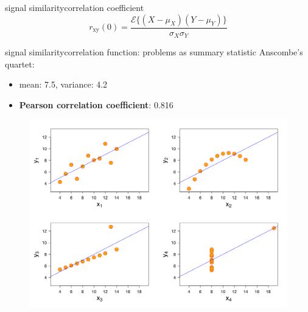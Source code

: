 \begin{frame}{signal similarity}{correlation coefficient}
    \begin{equation}\nonumber
        r_\mathrm{xy}(0) = \frac{\mathcal{E}\lbrace(X-\mu_X)(Y-\mu_Y)\rbrace}{\sigma_X\sigma_Y}
    \end{equation}
\end{frame}

\begin{frame}{signal similarity}{correlation function: problems as summary statistic}
Anscombe's quartet:
    \begin{itemize}
        \item   mean: 7.5, variance: 4.2
        \item   \textbf{Pearson correlation coefficient}: 0.816
    \end{itemize}
    \begin{figure}
        \includegraphics[scale=.2]{graph/Anscombes_quartet}
    \end{figure}
\end{frame}

